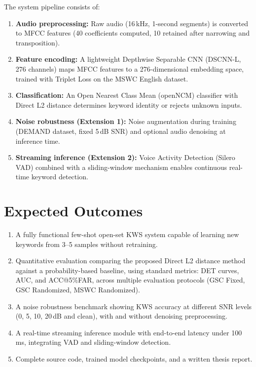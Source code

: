 \documentclass[12pt,a4paper]{article}
\begin{document}
The system pipeline consists of:
\begin{enumerate}[leftmargin=1.5cm]
    \item \textbf{Audio preprocessing:} Raw audio (16\,kHz, 1-second segments) is converted to MFCC features (40 coefficients computed, 10 retained after narrowing and transposition).
    \item \textbf{Feature encoding:} A lightweight Depthwise Separable CNN (DSCNN-L, 276 channels) maps MFCC features to a 276-dimensional embedding space, trained with Triplet Loss on the MSWC English dataset.
    \item \textbf{Classification:} An Open Nearest Class Mean (openNCM) classifier with Direct L2 distance determines keyword identity or rejects unknown inputs.
    \item \textbf{Noise robustness (Extension 1):} Noise augmentation during training (DEMAND dataset, fixed 5\,dB SNR) and optional audio denoising at inference time.
    \item \textbf{Streaming inference (Extension 2):} Voice Activity Detection (Silero VAD) combined with a sliding-window mechanism enables continuous real-time keyword detection.
\end{enumerate}


\section*{Expected Outcomes}

\begin{enumerate}[leftmargin=1.5cm]
    \item A fully functional few-shot open-set KWS system capable of learning new keywords from 3--5 samples without retraining.

    \item Quantitative evaluation comparing the proposed Direct L2 distance method against a probability-based baseline, using standard metrics: DET curves, AUC, and ACC@5\%FAR, across multiple evaluation protocols (GSC Fixed, GSC Randomized, MSWC Randomized).

    \item A noise robustness benchmark showing KWS accuracy at different SNR levels (0, 5, 10, 20\,dB and clean), with and without denoising preprocessing.

    \item A real-time streaming inference module with end-to-end latency under 100\,ms, integrating VAD and sliding-window detection.

    \item Complete source code, trained model checkpoints, and a written thesis report.
\end{enumerate}
\end{document}
